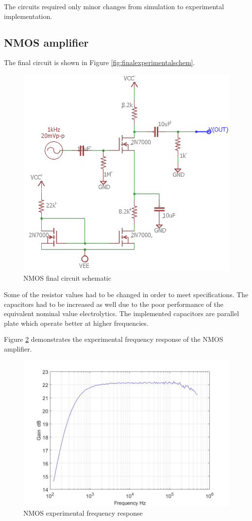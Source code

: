 
The circuits required only minor changes from simulation to experimental implementation.	
	

\subsection{NMOS amplifier}
The final circuit is shown in Figure \ref{fig:finalexperimentalschem}.
\begin{figure}[H]
	\centering
	\includegraphics[width=0.7\linewidth]{ExperimentalImplementation/NMOS_exp}
	\caption{NMOS final circuit schematic}
	\label{fig:nmosexp}
\end{figure}
Some of the resistor values had to be changed in order to meet specifications. The capacitors had to be increased as well due to the poor performance of the equivalent nominal value electrolytics. The implemented capacitors are parallel plate which operate better at higher frequencies. 

Figure \ref{fig:nmosfreq} demonstrates the experimental frequency response of the NMOS amplifier. 



\begin{figure}[H]
	\centering
	\includegraphics[width=0.7\linewidth]{ExperimentalImplementation/nmosamp.jpg}
	\caption{NMOS experimental frequency response}
	\label{fig:nmosfreq}
\end{figure}


